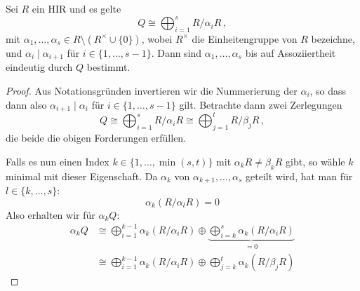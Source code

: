 \begin{thLemma}\label{lem:iso:divisors:unique}
    Sei $R$ ein HIR und es gelte
    \[ Q \cong \bigoplus_{i=1}^s R/\alpha_i R \,, \]
    mit $\alpha_1,\ldots,\alpha_s \in R\setminus (R^\times\cup\{0\})$, wobei
    $R^\times$ die Einheitengruppe von $R$ bezeichne, und
    $\alpha_i\mid\alpha_{i+1}$ für $i\in\{1,\ldots,s-1\}$.
    Dann sind $\alpha_1,\ldots,\alpha_s$ bis auf Assoziiertheit eindeutig durch
    $Q$ bestimmt.
\end{thLemma}

\begin{proof}
    Aus Notationsgründen invertieren wir die Nummerierung der $\alpha_i$,
    so dass dann also $\alpha_{i+1} \mid \alpha_i$ für $i\in\{1,\ldots,s-1\}$
    gilt. Betrachte dann zwei Zerlegungen
    \[ Q \cong 
        \bigoplus_{i=1}^s R/\alpha_i R \cong \bigoplus_{j=1}^t R/\beta_j R \,,\]
    die beide die obigen Forderungen erfüllen.
    
    Falls es nun einen Index $k\in\{1,\ldots,\min(s,t)\}$ mit
    $\alpha_k R \neq \beta_k R$ gibt, so wähle $k$ minimal mit dieser
    Eigenschaft. Da $\alpha_k$ von $\alpha_{k+1},\ldots,\alpha_s$ geteilt wird,
    hat man für $l\in\{k,\ldots,s\}$:
    \[ \alpha_k (R/\alpha_l R) = 0 \]
    Also erhalten wir für $\alpha_k Q$:
    \begin{align*}
        \alpha_k Q 
        &\cong      \bigoplus_{i=1}^{k-1} \alpha_k (R/\alpha_i R) \oplus
        \underbrace{\bigoplus_{i=k}^{s}   \alpha_k (R/\alpha_i R)}_{= 0}  \\
        &\cong \bigoplus_{i=1}^{k-1} \alpha_k (R/\alpha_i R) \oplus
               \bigoplus_{j=k}^{t}   \alpha_k (R/\beta_j R)
    \end{align*}
    

\end{proof}
